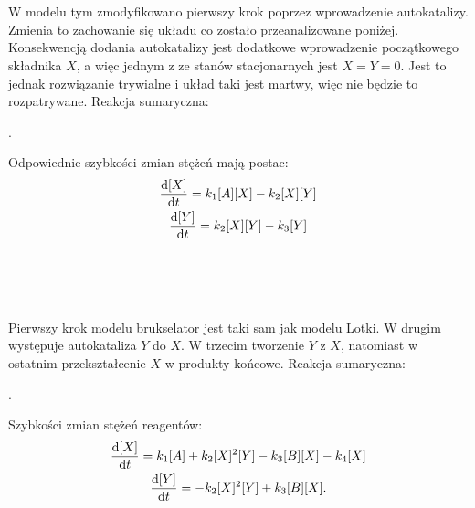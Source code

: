 \documentclass[10pt, a4paper, twoside, onecolumn]{article}
\numberwithin{equation}{section}
\begin{document}
	\begin{center}
		 \\
		 \\
	\end{center}
	W modelu tym zmodyfikowano pierwszy krok poprzez wprowadzenie autokatalizy. Zmienia to zachowanie się układu co zostało przeanalizowane poniżej. Konsekwencją dodania autokatalizy jest dodatkowe wprowadzenie początkowego składnika \(X\), a więc jednym z ze stanów stacjonarnych jest \(X=Y=0\). Jest to jednak rozwiązanie trywialne i układ taki jest martwy, więc nie będzie to rozpatrywane. Reakcja sumaryczna:
	\begin{center}
		.
	\end{center}
	Odpowiednie szybkości zmian stężeń mają postac:
	\begin{gather}
		\dv{[X]}{t}=k_{1}[A][X]-k_{2}[X][Y] \\
		\dv{[Y]}{t}=k_{2}[X][Y]-k_{3}[Y]
	\end{gather}
	\begin{center}
		 \\
		 \\
		 \\
	\end{center}
	Pierwszy krok modelu brukselator jest taki sam jak modelu Lotki. W drugim występuje autokataliza \(Y\) do \(X\). W trzecim tworzenie \(Y\) z \(X\), natomiast w ostatnim przekształcenie \(X\) w produkty końcowe. Reakcja sumaryczna: 
	\begin{center}
		.
	\end{center}
	Szybkości zmian stężeń reagentów: 
	\begin{gather}
		\dv{[X]}{t}=k_{1}[A]+k_{2}[X]^{2}[Y]-k_{3}[B][X]-k_{4}[X] \\
		\dv{[Y]}{t}=-k_{2}[X]^{2}[Y]+k_{3}[B][X].
	\end{gather}
	
\end{document}
